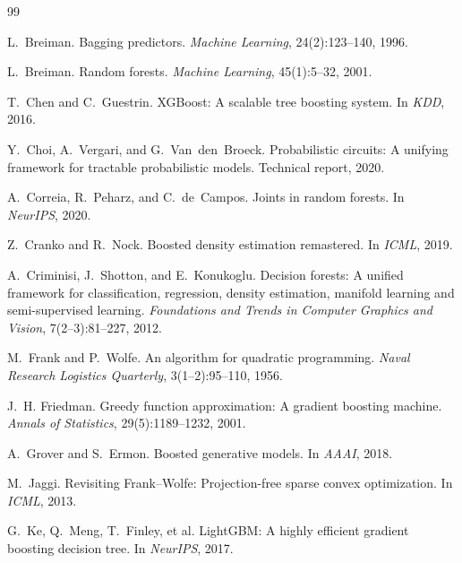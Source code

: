 \documentclass[11pt]{article}
\theoremstyle{plain}
\theoremstyle{definition}
\theoremstyle{remark}
\begin{document}
\begin{thebibliography}{99}
\setlength{\itemsep}{1pt}

L.~Breiman. Bagging predictors. \emph{Machine Learning}, 24(2):123--140,
1996.

L.~Breiman. Random forests. \emph{Machine Learning}, 45(1):5--32, 2001.

T.~Chen and C.~Guestrin. XGBoost: A scalable tree boosting system. In
\emph{KDD}, 2016.

Y.~Choi, A.~Vergari, and G.~Van~den~Broeck. Probabilistic circuits: A
unifying framework for tractable probabilistic models. Technical report,
2020.

A.~Correia, R.~Peharz, and C.~de~Campos. Joints in random forests. In
\emph{NeurIPS}, 2020.

Z.~Cranko and R.~Nock. Boosted density estimation remastered. In
\emph{ICML}, 2019.

A.~Criminisi, J.~Shotton, and E.~Konukoglu. Decision forests: A unified
framework for classification, regression, density estimation, manifold
learning and semi-supervised learning. \emph{Foundations and Trends in
Computer Graphics and Vision}, 7(2--3):81--227, 2012.

M.~Frank and P.~Wolfe. An algorithm for quadratic programming.
\emph{Naval Research Logistics Quarterly}, 3(1--2):95--110, 1956.

J.~H. Friedman. Greedy function approximation: A gradient boosting machine.
\emph{Annals of Statistics}, 29(5):1189--1232, 2001.

A.~Grover and S.~Ermon. Boosted generative models. In \emph{AAAI}, 2018.

M.~Jaggi. Revisiting Frank--Wolfe: Projection-free sparse convex
optimization. In \emph{ICML}, 2013.

G.~Ke, Q.~Meng, T.~Finley, et al. LightGBM: A highly efficient gradient
boosting decision tree. In \emph{NeurIPS}, 2017.


\end{thebibliography}
\end{document}
